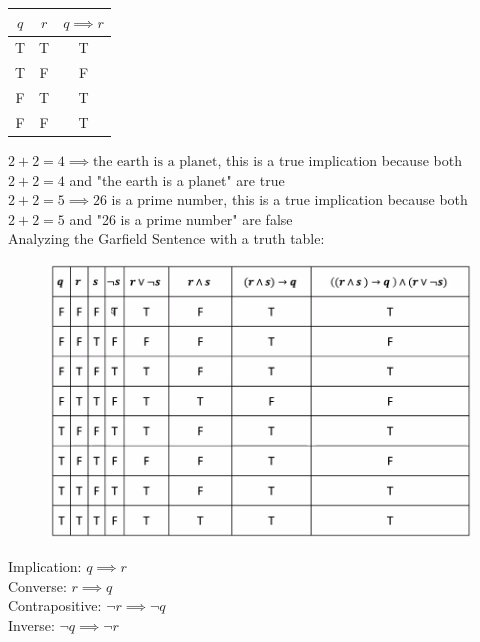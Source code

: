 \documentclass{article}
\begin{document}
    \begin{center}
        \begin{tabular}{|c|c|c|}
            \hline
            $q$ &   $r$ & $q\implies r$ \\
            \hline
            T   &   T   & T \\
            \hline
            T   &   F   & F \\
            \hline
            F   &   T   & T \\
            \hline
            F   &   F   & T \\
            \hline
        \end{tabular}
    \end{center}

    \textit{} $2+2=4\implies \text{the earth is a planet}$, this is a true implication because both $2+2=4$ and "the earth is a planet" are true \\
    \textit{} $2+2 = 5 \implies 26$ is a prime number, this is a true implication because both $2+2=5$ and "26 is a prime number" are false \\

    Analyzing the Garfield Sentence with a truth table:

    \begin{figure}[hbt!]
        \centering
        \includegraphics[scale = 0.75]{Assets/Garfield}
    \end{figure}

    Implication: $q\implies r$ \\
    Converse: $r\implies q$ \\
    Contrapositive: $\neg r \implies \neg q$ \\
    Inverse: $\neg q \implies \neg r$ \\
\end{document}
